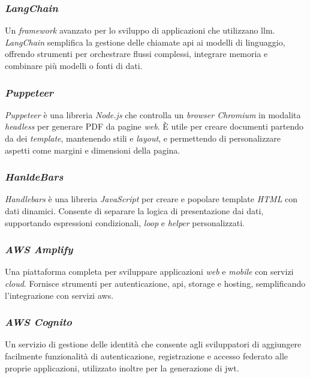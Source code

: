 \subsubsection{\textit{LangChain}}

Un \textit{framework} avanzato per lo sviluppo di applicazioni che utilizzano \gls{llm}. 
\textit{LangChain} semplifica la gestione delle chiamate \gls{api} ai modelli di linguaggio, offrendo strumenti per orchestrare flussi complessi, integrare memoria e combinare più modelli o fonti di dati.

\subsubsection{\textit{Puppeteer}}

\textit{Puppeteer} è una libreria \textit{Node.js} che controlla un \textit{browser Chromium} in modalita \textit{headless} per generare PDF da pagine \textit{web}.
È utile per creare documenti partendo da dei \textit{template}, mantenendo stili e \textit{layout}, e permettendo di personalizzare aspetti come margini e dimensioni della pagina.

\subsubsection{\textit{HanldeBars}}

\textit{Handlebars} è una libreria \textit{JavaScript} per creare e popolare template \textit{HTML} con dati dinamici. 
Consente di separare la logica di presentazione dai dati, supportando espressioni condizionali, \textit{loop} e \textit{helper} personalizzati.

\subsubsection{\textit{AWS Amplify}}

Una piattaforma completa per sviluppare applicazioni \textit{web} e \textit{mobile} con servizi \textit{cloud}. 
Fornisce strumenti per autenticazione, \gls{api}, storage e hosting, semplificando l'integrazione con servizi \gls{aws}.

\subsubsection{\textit{AWS Cognito}}

Un servizio di gestione delle identità che consente agli sviluppatori di aggiungere facilmente funzionalità di autenticazione, registrazione e accesso federato alle proprie applicazioni,
 utilizzato inoltre per la generazione di \gls{jwt}.


